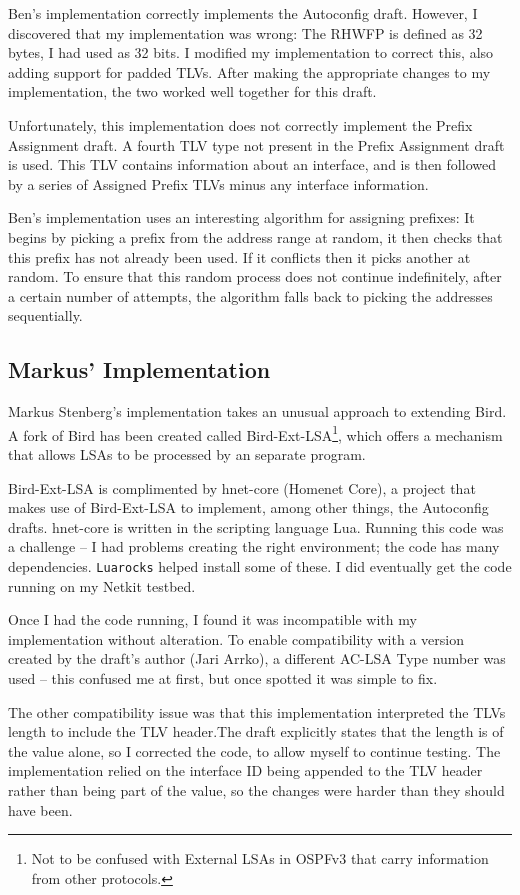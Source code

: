 \documentclass[12pt,a4paper,twoside]{report}
\begin{document}
Ben's implementation correctly implements the Autoconfig draft. However, I
discovered that my implementation was wrong: The RHWFP is defined as 32 bytes,
I had used as 32 bits. I modified my implementation to correct this, also
adding support for padded TLVs. After making the appropriate changes to my
implementation, the two worked well together for this draft.

Unfortunately, this implementation does not correctly implement the Prefix
Assignment draft. A fourth TLV type not present in the Prefix Assignment draft
is used. This TLV contains information about an interface, and is then followed
by a series of Assigned Prefix TLVs minus any interface information. 

Ben's implementation uses an interesting algorithm for assigning prefixes:
It begins by picking a prefix from the address range at random, it then checks
that this prefix has not already been used. If it conflicts then it picks
another at random. To ensure that this random process does not continue
indefinitely, after a certain number of attempts, the algorithm falls back to
picking the addresses sequentially. 

\subsection{Markus' Implementation}
Markus Stenberg's implementation takes an unusual approach to extending Bird. A
fork of Bird has been created called Bird-Ext-LSA\@\footnote{Not to be confused
with External LSAs in OSPFv3 that carry information from other protocols.},
which offers a mechanism that allows LSAs to be processed by an separate
program. 

Bird-Ext-LSA is complimented by hnet-core (Homenet Core), a project that makes
use of Bird-Ext-LSA to implement, among other things, the Autoconfig drafts\@.
hnet-core is written in the scripting language Lua. Running this code was a
challenge -- I had problems creating the right environment; the code has  many
dependencies. \texttt{Luarocks} helped install some of these. I did eventually
get the code running on my Netkit testbed.

Once I had the code running, I found it was incompatible with my implementation
without alteration. To enable compatibility with a version created by the
draft's author (Jari Arrko), a different AC-LSA Type number was used -- this
confused me at first, but once spotted it was simple to fix.

The other compatibility issue was that this implementation interpreted the TLVs
length to include the TLV header.The draft explicitly states that the length is
of the value alone, so I corrected the code, to allow myself to continue
testing. The implementation relied on the interface ID being appended to the
TLV header rather than being part of the value, so the changes were harder than
they should have been.
\end{document}
